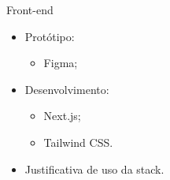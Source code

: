 \begin{frame}{Front-end}
    \begin{itemize}
        \item Protótipo: \vspace{0.5cm}
              \begin{itemize}
                  \item Figma; \vspace{0.5cm}
              \end{itemize}
        \item Desenvolvimento: \vspace{0.5cm}
              \begin{itemize}
                  \item Next.js; \vspace{0.5cm}
                  \item Tailwind CSS. \vspace{0.5cm}
              \end{itemize}
        \item Justificativa de uso da stack. \vspace{0.5cm}
    \end{itemize}
\end{frame}


